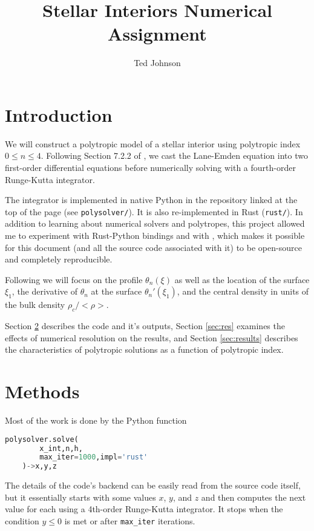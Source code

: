 \documentclass[twocolumn]{aastex631}
\begin{document}
\title{Stellar Interiors Numerical Assignment}

\author{Ted Johnson}


\section{Introduction}
\label{sec:intro}

We will construct a polytropic model of a stellar interior using
polytropic index $0\le n \le 4$. Following Section 7.2.2 of
\citet{textbook}, we cast the Lane-Emden equation into two
first-order differential equations before numerically solving
with a fourth-order Runge-Kutta integrator.

The integrator is implemented in native Python in the repository
linked at the top of the page (see \texttt{polysolver/}). It is
also re-implemented in Rust (\texttt{rust/}). In addition to
learning about numerical solvers and polytropes, this project
allowed me to experiment with Rust-Python bindings and with
\showyourwork \citep{Luger2021}, which makes it possible for
this document (and all the source code associated
with it) to be open-source and completely
reproducible.

Following \citet{textbook} we will focus on the profile $\theta_n(\xi)$
as well as the location of the surface $\xi_1$, the derivative
of $\theta_n$ at the surface $\theta_n'(\xi_1)$, and the central
density in units of the bulk density $\rho_c/<\rho>$.

Section \ref{sec:methods} describes the code and it's outputs,
Section \ref{sec:res} examines the effects of numerical resolution
on the results, and Section \ref{sec:results} describes the characteristics
of polytropic solutions as a function of polytropic index.

\section{Methods}
\label{sec:methods}
Most of the work is done by the Python function
\begin{lstlisting}[language=Python]
    polysolver.solve(
        x_int,n,h,
        max_iter=1000,impl='rust'
    )->x,y,z
\end{lstlisting}

The details of the code's backend can be easily read from
the source code itself, but it essentially starts with some
values $x$, $y$, and $z$ and then computes the next value for
each using a 4th-order Runge-Kutta integrator. It stops when
the condition $y \le 0$ is met or after \texttt{max\_iter} iterations.
\end{document}
